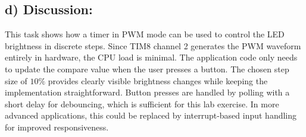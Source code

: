 \subsection{d) Discussion:}
This task shows how a timer in PWM mode can be used to control the LED brightness in discrete steps. Since TIM8 channel 2 generates the PWM waveform entirely in hardware, the CPU load is minimal. The application code only needs to update the compare value when the user presses a button. The chosen step size of $10 \%$ provides clearly visible brightness changes while keeping the implementation straightforward. 
Button presses are handled by polling with a short delay for debouncing, which is sufficient for this lab exercise. In more advanced applications, this could be replaced by interrupt-based input handling for improved responsiveness.